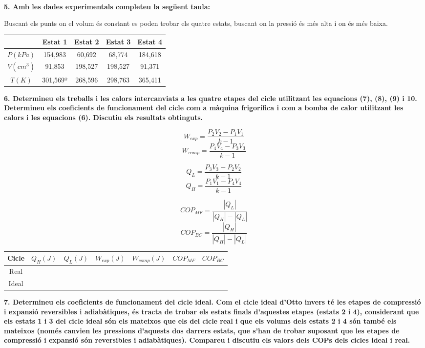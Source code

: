 \documentclass[a4paper]{article}
\begin{document}
\textbf{5. Amb les dades experimentals completeu la següent taula:}

Buscant els punts on el volum és constant es poden trobar els quatre estats, buscant on la pressió és més alta i on és més baixa.

\begin{tabular}{c|cccc}
    & Estat 1 & Estat 2 & Estat 3 & Estat 4 \\
    \hline
    $P(kPa)$ & 154,983 & 60,692 & 68,774 & 184,618 \\
    $V(cm^3)$ & 91,853 & 198,527 & 198,527 & 91,371 \\
    $T(K)$ & 301,569º & 268,596 & 298,763 & 365,411 \\
\end{tabular}

\textbf{6. Determineu els treballs i les calors intercanviats a les quatre etapes del cicle utilitzant les equacions (7), (8), (9) i 10. Determineu els coeficients de funcionament del cicle com a màquina frigorífica i com a bomba de calor utilitzant les calors i les equacions (6). Discutiu els resultats obtinguts.}

$$ W_{exp} = \frac{P_2 V_2 - P_1 V_1}{k - 1} $$
$$ W_{comp} = \frac{P_4 V_4 - P_3 V_3}{k - 1} $$

$$ Q_L = \frac{P_3 V_3 - P_2 V_2}{k - 1} $$
$$ Q_H = \frac{P_1 V_1 - P_4 V_4}{k - 1} $$

$$ COP_{MF} = \frac{|Q_L|}{|Q_H| - |Q_L|} $$
$$ COP_{BC} = \frac{|Q_H|}{|Q_H| - |Q_L|} $$

\begin{tabular}{c|cccccc}
    Cicle & $Q_H(J)$ & $Q_L(J)$ & $W_{exp}(J)$ & $W_{comp}(J)$ & $COP_{MF}$ & $COP_{BC}$ \\
    \hline
    Real & & & & & & \\
    Ideal & & & & & &
\end{tabular}

\textbf{7. Determineu els coeficients de funcionament del cicle ideal. Com el cicle ideal d’Otto invers té les etapes de compressió i expansió reversibles i adiabàtiques, és tracta de trobar els estats finals d’aquestes etapes (estats 2 i 4), considerant que els estats 1 i 3 del cicle ideal són els mateixos que els del cicle real i que els volums dels estats 2 i 4 són també els mateixos (només canvien les pressions d’aquests dos darrers estats, que s’han de trobar suposant que les etapes de compressió i expansió són reversibles i adiabàtiques). Compareu i discutiu els valors dels COPs dels cicles ideal i real.}
\end{document}
